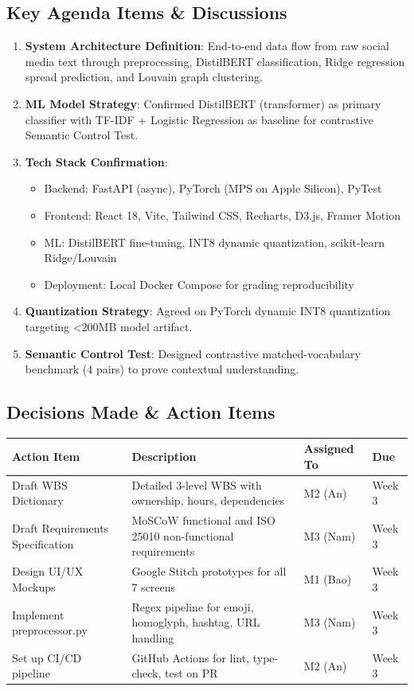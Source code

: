 \documentclass[11pt, a4paper]{article}
\begin{document}
\subsection*{Key Agenda Items \& Discussions}
\begin{enumerate}
  \item \textbf{System Architecture Definition}: End-to-end data flow from raw social media text through preprocessing, DistilBERT classification, Ridge regression spread prediction, and Louvain graph clustering.
  \item \textbf{ML Model Strategy}: Confirmed DistilBERT (transformer) as primary classifier with TF-IDF + Logistic Regression as baseline for contrastive Semantic Control Test.
  \item \textbf{Tech Stack Confirmation}:
  \begin{itemize}
    \item Backend: FastAPI (async), PyTorch (MPS on Apple Silicon), PyTest
    \item Frontend: React 18, Vite, Tailwind CSS, Recharts, D3.js, Framer Motion
    \item ML: DistilBERT fine-tuning, INT8 dynamic quantization, scikit-learn Ridge/Louvain
    \item Deployment: Local Docker Compose for grading reproducibility
  \end{itemize}
  \item \textbf{Quantization Strategy}: Agreed on PyTorch dynamic INT8 quantization targeting <200MB model artifact.
  \item \textbf{Semantic Control Test}: Designed contrastive matched-vocabulary benchmark (4 pairs) to prove contextual understanding.
\end{enumerate}

\subsection*{Decisions Made \& Action Items}

\begin{table}[H]
  \centering
  \scriptsize
  \begin{tabularx}{\linewidth}{@{}L{6cm} L{3cm} L{2cm} L{2cm}@{}}
    \toprule
    \textbf{Action Item} & \textbf{Description} & \textbf{Assigned To} & \textbf{Due} \\
    \midrule
    Draft WBS Dictionary & Detailed 3-level WBS with ownership, hours, dependencies & M2 (An) & Week 3 \\
    Draft Requirements Specification & MoSCoW functional and ISO 25010 non-functional requirements & M3 (Nam) & Week 3 \\
    Design UI/UX Mockups & Google Stitch prototypes for all 7 screens & M1 (Bao) & Week 3 \\
    Implement preprocessor.py & Regex pipeline for emoji, homoglyph, hashtag, URL handling & M3 (Nam) & Week 3 \\
    Set up CI/CD pipeline & GitHub Actions for lint, type-check, test on PR & M2 (An) & Week 3 \\
    \bottomrule
  \end{tabularx}
\end{table}
\end{document}
